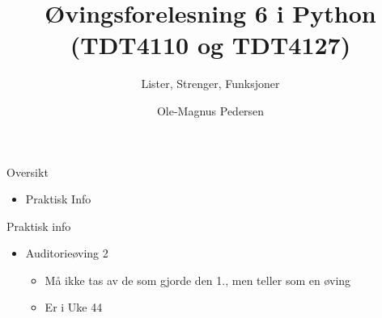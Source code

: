 \documentclass[screen, aspectratio=169]{beamer}
\title[Short title]{Øvingsforelesning 6 i Python (TDT4110 og TDT4127)}
\subtitle{Lister, Strenger, Funksjoner}
\author[O.M. Pedersen]{Ole-Magnus Pedersen}
\institute[NTNU]{}
\date{}
\begin{document}
\begin{frame}
  \titlepage
\end{frame}


\begin{frame}{Oversikt}
	\begin{itemize}
		\item Praktisk Info
	\end{itemize}
\end{frame}

\begin{frame}{Praktisk info}
	\begin{itemize}
		\item Auditorieøving 2
		\begin{itemize}
		    \item Må ikke tas av de som gjorde den 1., men teller som en øving
		    \item Er i Uke 44
		\end{itemize}
	\end{itemize}
\end{frame}

\end{document}
